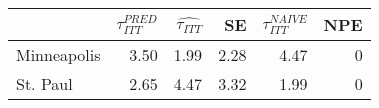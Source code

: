 
\begin{tabular}{lrrrrr}
\toprule
  & $\tau_{ITT}^{PRED}$ & $\hat{\tau_{ITT}}$ & SE & $\tau_{ITT}^{NAIVE}$ & NPE\\
\midrule
Minneapolis & 3.50 & 1.99 & 2.28 & 4.47 & 0\\
St. Paul & 2.65 & 4.47 & 3.32 & 1.99 & 0\\
\bottomrule
\end{tabular}